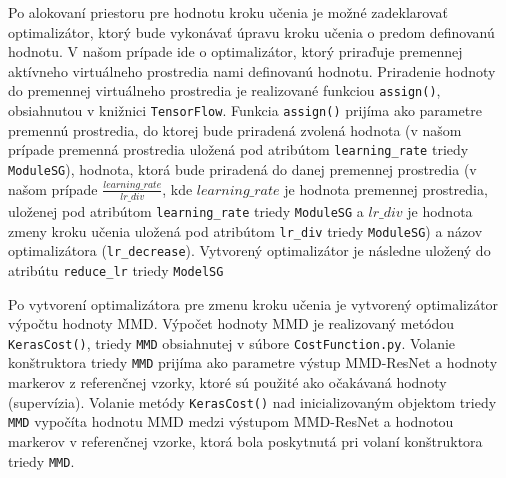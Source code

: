 Po alokovaní priestoru pre hodnotu kroku učenia je možné zadeklarovať optimalizátor, ktorý bude vykonávať úpravu kroku učenia o predom definovanú hodnotu. V našom prípade ide o optimalizátor, ktorý priraďuje premennej aktívneho virtuálneho prostredia nami definovanú hodnotu. Priradenie hodnoty do premennej virtuálneho prostredia je realizované funkciou \texttt{assign()}, obsiahnutou v knižnici \texttt{TensorFlow}. Funkcia \texttt{assign()} prijíma ako parametre premennú prostredia, do ktorej bude priradená zvolená hodnota (v našom prípade premenná prostredia uložená pod atribútom \texttt{learning_rate} triedy \texttt{ModuleSG}), hodnota, ktorá bude priradená do danej premennej prostredia (v našom prípade $\frac{learning\_rate}{lr\_div}$, kde $learning\_rate$ je hodnota premennej prostredia, uloženej pod atribútom \texttt{learning_rate} triedy \texttt{ModuleSG} a $lr\_div$ je hodnota zmeny kroku učenia uložená pod atribútom \texttt{lr_div} triedy \texttt{ModuleSG}) a názov optimalizátora (\texttt{lr_decrease}). Vytvorený optimalizátor je následne uložený do atribútu \texttt{reduce_lr} triedy \texttt{ModelSG}

Po vytvorení optimalizátora pre zmenu kroku učenia je vytvorený optimalizátor výpočtu hodnoty MMD. Výpočet hodnoty MMD je realizovaný metódou \texttt{KerasCost()}, triedy \texttt{MMD} obsiahnutej v súbore \texttt{CostFunction.py}. Volanie konštruktora triedy \texttt{MMD} prijíma ako parametre výstup MMD-ResNet a hodnoty markerov z referenčnej vzorky, ktoré sú použité ako očakávaná hodnoty (supervízia). Volanie metódy \texttt{KerasCost()} nad inicializovaným objektom triedy \texttt{MMD} vypočíta hodnotu MMD medzi výstupom MMD-ResNet a hodnotou markerov v referenčnej vzorke, ktorá bola poskytnutá pri volaní konštruktora triedy \texttt{MMD}.

